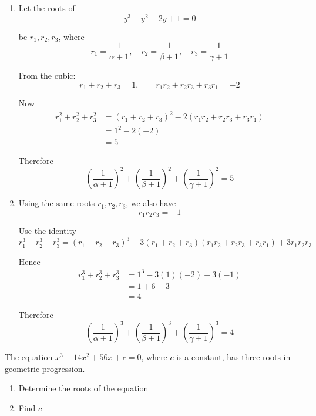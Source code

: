 \documentclass[leqno]{article}
\begin{document}
\begin{enumerate}[
  label=\textbf{\arabic*.},
  leftmargin=*,
  topsep=0pt,
  partopsep=0pt,
  parsep=0pt
]
\begin{djsSolution}
\begin{enumerate}[label=\textbf{(\alph*)}]
  So
  \[
  y^3-y^2-2y+1=0
  \]

  When $x=\alpha,\beta,\gamma$, the corresponding values of $y$ are
  \[
  \frac{1}{\alpha+1},\quad \frac{1}{\beta+1},\quad \frac{1}{\gamma+1}
  \]

  so the required cubic equation is
  \[
  y^3-y^2-2y+1=0
  \]

  \item Let the roots of
  \[
  y^3-y^2-2y+1=0
  \]

  be \(r_1,r_2,r_3\), where
  \[
  r_1=\frac{1}{\alpha+1},\quad r_2=\frac{1}{\beta+1},\quad r_3=\frac{1}{\gamma+1}
  \]

  From the cubic:
  \[
  r_1+r_2+r_3=1,\qquad r_1r_2+r_2r_3+r_3r_1=-2
  \]

  Now
  \begin{align*}
  r_1^2+r_2^2+r_3^2&=(r_1+r_2+r_3)^2-2(r_1r_2+r_2r_3+r_3r_1)\\
  &=1^2-2(-2)\\
  &=5
  \end{align*}

  Therefore
  \[
  \left(\frac{1}{\alpha+1}\right)^2+\left(\frac{1}{\beta+1}\right)^2+\left(\frac{1}{\gamma+1}\right)^2=5
  \]

  \item Using the same roots \(r_1,r_2,r_3\), we also have
  \[
  r_1r_2r_3=-1
  \]

  Use the identity
  \[
  r_1^3+r_2^3+r_3^3=(r_1+r_2+r_3)^3-3(r_1+r_2+r_3)(r_1r_2+r_2r_3+r_3r_1)+3r_1r_2r_3
  \]

  Hence
  \begin{align*}
  r_1^3+r_2^3+r_3^3&=1^3-3(1)(-2)+3(-1)\\
  &=1+6-3\\
  &=4
  \end{align*}

  Therefore
  \[
  \left(\frac{1}{\alpha+1}\right)^3+\left(\frac{1}{\beta+1}\right)^3+\left(\frac{1}{\gamma+1}\right)^3=4
  \]
\end{enumerate}
\end{djsSolution}


\newpage

\questionitem

The equation $x^3 - 14x^2 + 56x + c = 0$, where $c$ is a constant, has three roots in geometric progression. \\

\begin{enumerate}[label=\textbf{(\alph*)}]
  \item Determine the roots of the equation  \\
  \item Find $c$  \\
\end{enumerate}


\end{enumerate}
\end{document}
